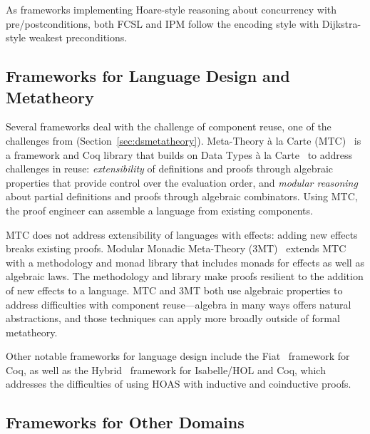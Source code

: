 As frameworks implementing Hoare-style reasoning about concurrency
with pre/postconditions, both FCSL and IPM follow the encoding style
with Dijkstra-style weakest preconditions.
%

\subsection{Frameworks for Language Design and Metatheory}
\label{sec:metaframe}

Several frameworks deal with the challenge of component reuse, one of the challenges from \poplmark (Section~\ref{sec:dsmetatheory}).
Meta-Theory \`{a} la Carte (MTC)~\citep{Delaware2013POPL} is a framework and Coq library that builds
on Data Types \`{a} la Carte~\citep{Swierstra2008} to address challenges in reuse:
\textit{extensibility} of definitions and proofs through algebraic properties that provide
control over the evaluation order, and \textit{modular reasoning} about partial definitions and proofs through algebraic combinators.
Using MTC, the proof engineer can assemble a language from existing components.

MTC does not address extensibility of languages with effects: adding
new effects breaks existing proofs. Modular Monadic Meta-Theory (3MT)~\citep{Delaware2013ICFP}
extends MTC with a methodology and monad library that includes monads
for effects as well as algebraic laws. The methodology and library make
proofs resilient to the addition of new effects to a language.
MTC and 3MT both use algebraic properties to address difficulties with component reuse---algebra in many ways offers
natural abstractions, and those techniques can apply more broadly outside of formal metatheory.

Other notable frameworks for language design include the Fiat~\citep{Chlipala2017, Delaware2015} framework for Coq,
as well as the Hybrid~\citep{felty2012hybrid} framework for
Isabelle/HOL and Coq, which addresses the difficulties of using HOAS with inductive and
coinductive proofs.

\subsection{Frameworks for Other Domains}
\label{sec:otherframe}

